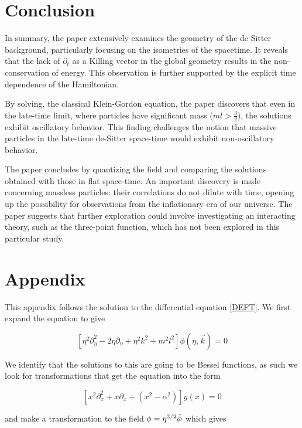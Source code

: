 \documentclass[a4paper,11pt]{article}
\numberwithin{equation}{section}
\numberwithin{figure}{section}
\begin{document}
\begin{large}
\newpage

\section{Conclusion}

In summary, the paper extensively examines the geometry of the de Sitter background, particularly focusing on the isometries of the spacetime. It reveals that the lack of $\partial_t$ as a Killing vector in the global geometry results in the non-conservation of energy. This observation is further supported by the explicit time dependence of the Hamiltonian.

By solving, the classical Klein-Gordon equation, the paper discovers that even in the late-time limit, where particles have significant mass ($ml>\frac{3}{2}$), the solutions exhibit oscillatory behavior. This finding challenges the notion that massive particles in the late-time de-Sitter space-time would exhibit non-oscillatory behavior.

The paper concludes by quantizing the field and comparing the solutions obtained with those in flat space-time. An important discovery is made concerning massless particles: their correlations do not dilute with time, opening up the possibility for observations from the inflationary era of our universe. The paper suggests that further exploration could involve investigating an interacting theory, such as the three-point function, which has not been explored in this particular study. 









\newpage

\section*{Appendix}

This appendix follows the solution to the differential equation \eqref{DEFT}. We first expand the equation to give

$$[\eta^2\partial_\eta^2-2\eta\partial_\eta+\eta^2k^2+m^2l^2]\phi(\eta,\Vec{k})=0$$

We identify that the solutions to this are going to be Bessel functions, as such we look for transformations that get the equation into the form

$$[x^2\partial_x^2+x\partial_x+(x^2-\alpha^2)]y(x)=0$$

and make a transformation to the field $\phi=\eta^{3/2}\Tilde{\phi}$ which gives 


\end{large}
\end{document}
